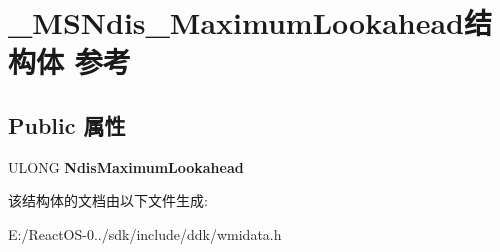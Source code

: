 \hypertarget{struct___m_s_ndis___maximum_lookahead}{}\section{\+\_\+\+M\+S\+Ndis\+\_\+\+Maximum\+Lookahead结构体 参考}
\label{struct___m_s_ndis___maximum_lookahead}
\subsection*{Public 属性}
\begin{DoxyCompactItemize}
\item 
\mbox{\label{struct___m_s_ndis___maximum_lookahead_a71490c1ee7210ec387b46ea9da74e02e}} 
U\+L\+O\+NG {\bfseries Ndis\+Maximum\+Lookahead}
\end{DoxyCompactItemize}


该结构体的文档由以下文件生成\+:\begin{DoxyCompactItemize}
\item 
E\+:/\+React\+O\+S-\/0../sdk/include/ddk/wmidata.\+h\end{DoxyCompactItemize}
